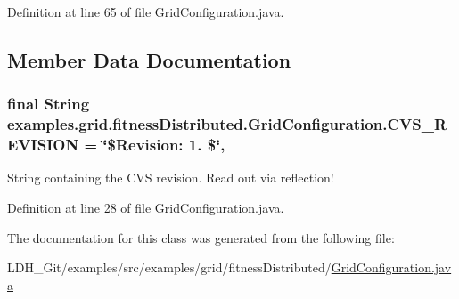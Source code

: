Definition at line 65 of file Grid\-Configuration.\-java.



\subsection{Member Data Documentation}
\hypertarget{classexamples_1_1grid_1_1fitness_distributed_1_1_grid_configuration_a4848c7e12f509418af153bf94befd7e2}{
\subsubsection[{C\-V\-S\-\_\-\-R\-E\-V\-I\-S\-I\-O\-N}]{\setlength{\rightskip}{0pt plus 5cm}final String examples.\-grid.\-fitness\-Distributed.\-Grid\-Configuration.\-C\-V\-S\-\_\-\-R\-E\-V\-I\-S\-I\-O\-N = \char`\"{}\$Revision\-: 1. \$\char`\"{}\hspace{0.3cm}{\ttfamily [static]}, {\ttfamily [private]}}}\label{classexamples_1_1grid_1_1fitness_distributed_1_1_grid_configuration_a4848c7e12f509418af153bf94befd7e2}
String containing the C\-V\-S revision. Read out via reflection! 

Definition at line 28 of file Grid\-Configuration.\-java.



The documentation for this class was generated from the following file\-:\begin{DoxyCompactItemize}
\item 
L\-D\-H\-\_\-\-Git/examples/src/examples/grid/fitness\-Distributed/\hyperlink{fitness_distributed_2_grid_configuration_8java}{Grid\-Configuration.\-java}\end{DoxyCompactItemize}
